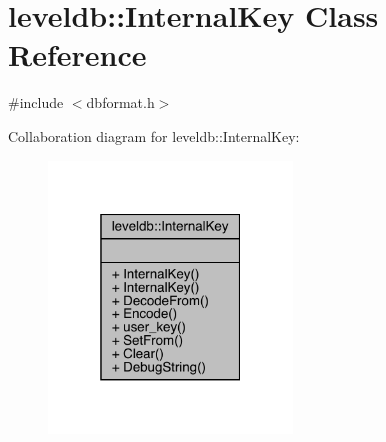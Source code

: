 \hypertarget{classleveldb_1_1_internal_key}{}\section{leveldb\+::Internal\+Key Class Reference}
\label{classleveldb_1_1_internal_key}


{\ttfamily \#include $<$dbformat.\+h$>$}



Collaboration diagram for leveldb\+::Internal\+Key\+:
\nopagebreak
\begin{figure}[H]
\begin{center}
\leavevmode
\includegraphics[width=184pt]{classleveldb_1_1_internal_key__coll__graph}
\end{center}
\end{figure}
